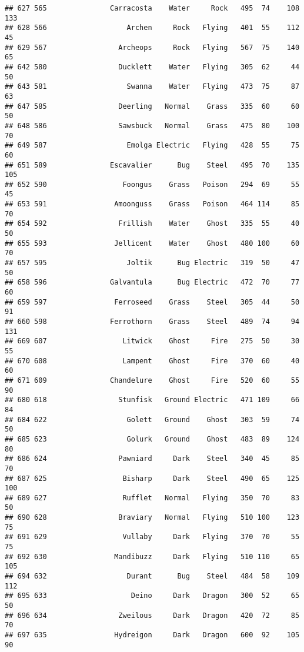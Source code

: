 \documentclass[
]{article}
\begin{document}
\begin{verbatim}
## 627 565               Carracosta    Water     Rock   495  74    108     133
## 628 566                   Archen     Rock   Flying   401  55    112      45
## 629 567                 Archeops     Rock   Flying   567  75    140      65
## 642 580                 Ducklett    Water   Flying   305  62     44      50
## 643 581                   Swanna    Water   Flying   473  75     87      63
## 647 585                 Deerling   Normal    Grass   335  60     60      50
## 648 586                 Sawsbuck   Normal    Grass   475  80    100      70
## 649 587                   Emolga Electric   Flying   428  55     75      60
## 651 589               Escavalier      Bug    Steel   495  70    135     105
## 652 590                  Foongus    Grass   Poison   294  69     55      45
## 653 591                Amoonguss    Grass   Poison   464 114     85      70
## 654 592                 Frillish    Water    Ghost   335  55     40      50
## 655 593                Jellicent    Water    Ghost   480 100     60      70
## 657 595                   Joltik      Bug Electric   319  50     47      50
## 658 596               Galvantula      Bug Electric   472  70     77      60
## 659 597                Ferroseed    Grass    Steel   305  44     50      91
## 660 598               Ferrothorn    Grass    Steel   489  74     94     131
## 669 607                  Litwick    Ghost     Fire   275  50     30      55
## 670 608                  Lampent    Ghost     Fire   370  60     40      60
## 671 609               Chandelure    Ghost     Fire   520  60     55      90
## 680 618                 Stunfisk   Ground Electric   471 109     66      84
## 684 622                   Golett   Ground    Ghost   303  59     74      50
## 685 623                   Golurk   Ground    Ghost   483  89    124      80
## 686 624                 Pawniard     Dark    Steel   340  45     85      70
## 687 625                  Bisharp     Dark    Steel   490  65    125     100
## 689 627                  Rufflet   Normal   Flying   350  70     83      50
## 690 628                 Braviary   Normal   Flying   510 100    123      75
## 691 629                  Vullaby     Dark   Flying   370  70     55      75
## 692 630                Mandibuzz     Dark   Flying   510 110     65     105
## 694 632                   Durant      Bug    Steel   484  58    109     112
## 695 633                    Deino     Dark   Dragon   300  52     65      50
## 696 634                 Zweilous     Dark   Dragon   420  72     85      70
## 697 635                Hydreigon     Dark   Dragon   600  92    105      90

\end{verbatim}
\end{document}
